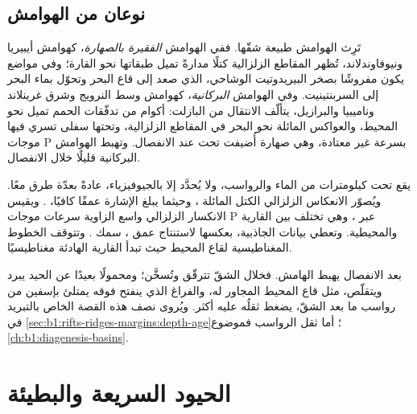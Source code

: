 \subsection*{نوعان من الهوامش}

تَرِث الهوامش طبيعة شقّها. ففي الهوامش \emph{الفقيرة بالصهارة}، كهوامش أيبيريا ونيوفاوندلاند، تُظهر المقاطع الزلزالية كتلًا مدارةً تميل طبقاتها نحو القارة؛ وفي مواضع يكون  مفروشًا بصخر البيريدوتيت الوشاحي، الذي صعد إلى قاع البحر وتحوّل بماء البحر إلى السربنتينيت. وفي الهوامش \emph{البركانية}، كهوامش وسط النرويج وشرق غرينلاند وناميبيا والبرازيل، يتألّف الانتقال من البازلت: أكوام من تدفّقات الحمم تميل نحو المحيط، والعواكس المائلة نحو البحر في المقاطع الزلزالية، وتحتها  سفلى تسري فيها موجات P بسرعة غير معتادة، وهي صهارة أُضيفت تحت  عند الانفصال. وتهبط الهوامش البركانية قليلًا خلال الانفصال.

\begin{inthefield}
يقع  تحت كيلومترات من الماء والرواسب، ولا يُحدَّد إلا بالجيوفيزياء، عادةً بعدّة طرق معًا. ويُصوّر الانعكاس الزلزالي الكتل المائلة ، وحيثما يبلغ الإشارة عمقًا كافيًا، . ويقيس الانكسار الزلزالي واسع الزاوية سرعات موجات P عبر ، وهي تختلف بين  القارية والمحيطية. وتعطي بيانات الجاذبية، بعكسها لاستنتاج عمق ، سمك . وتتوقف الخطوط المغناطيسية لقاع المحيط حيث تبدأ  القارية الهادئة مغناطيسيًا.
\end{inthefield}

بعد الانفصال يهبط الهامش. فخلال الشقّ تترقّق  وتُسخَّن؛ ومحمولًا بعيدًا عن الحيد يبرد ويتقلّص، مثل قاع المحيط المجاور له، والفراغ الذي ينفتح فوقه يمتلئ بإسفين من رواسب ما بعد الشقّ، يضغط ثقلُه عليه أكثر. ويُروى نصف هذه القصة الخاص بالتبريد في \cref{sec:b1:rifts-ridges-margins:depth-age}؛ أما ثقل الرواسب فموضوع \cref{ch:b1:diagenesis-basins}.

\section{الحيود السريعة والبطيئة}

